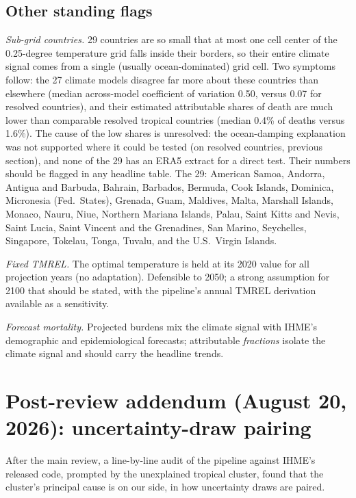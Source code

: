 \documentclass[11pt]{ozreport}
\begin{document}
\subsection{Other standing flags}

\emph{Sub-grid countries.} 29 countries are so small that at most one cell
center of the 0.25-degree temperature grid falls inside their borders, so
their entire climate signal comes from a single (usually ocean-dominated)
grid cell. Two symptoms follow: the 27 climate models disagree far more
about these countries than elsewhere (median across-model coefficient of
variation 0.50, versus 0.07 for resolved countries), and their estimated
attributable shares of death are much lower than comparable resolved
tropical countries (median 0.4\% of deaths versus 1.6\%). The cause of the
low shares is unresolved: the ocean-damping explanation was not supported
where it could be tested (on resolved countries, previous section), and
none of the 29 has an ERA5 extract for a direct test. Their numbers should
be flagged in any headline table. The 29:
American Samoa, Andorra, Antigua and Barbuda, Bahrain, Barbados, Bermuda,
Cook Islands, Dominica, Micronesia (Fed.\ States), Grenada, Guam, Maldives,
Malta, Marshall Islands, Monaco, Nauru, Niue, Northern Mariana Islands,
Palau, Saint Kitts and Nevis, Saint Lucia, Saint Vincent and the
Grenadines, San Marino, Seychelles, Singapore, Tokelau, Tonga, Tuvalu, and
the U.S.\ Virgin Islands.

\emph{Fixed TMREL.} The optimal temperature is held at its 2020 value for
all projection years (no adaptation). Defensible to 2050; a strong
assumption for 2100 that should be stated, with the pipeline's annual
TMREL derivation available as a sensitivity.

\emph{Forecast mortality.} Projected burdens mix the climate signal with
IHME's demographic and epidemiological forecasts; attributable
\emph{fractions} isolate the climate signal and should carry the headline
trends.

\section{Post-review addendum (August 20, 2026): uncertainty-draw pairing}
\label{sec:addendum}

After the main review, a line-by-line audit of the pipeline against IHME's
released code, prompted by the unexplained tropical cluster, found that the
cluster's principal cause is on our side, in how uncertainty draws are
paired.
\end{document}
